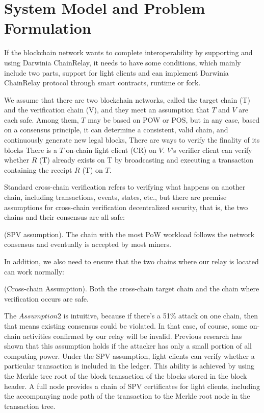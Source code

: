 \section{System Model and Problem Formulation}

If the blockchain network wants to complete interoperability by supporting and using Darwinia ChainRelay, it needs to have some conditions, which mainly include two parts, support for light clients and can implement Darwinia ChainRelay protocol through smart contracts, runtime or fork.

We assume that there are two blockchain networks, called the target chain (T) and the verification chain (V), and they meet an assumption that $T$ and $V$ are each safe. Among them, $T$ may be based on POW or POS, but in any case, based on a consensus principle, it can determine a consistent, valid chain, and continuously generate new legal blocks, There are ways to verify the finality of its blocks There is a $T$ on-chain light client (CR) on $V$. $V$'s verifier client can verify whether $R$ (T) already exists on T by broadcasting and executing a transaction containing the receipt $R$ (T) on $T$.

Standard cross-chain verification refers to verifying what happens on another chain, including transactions, events, states, etc., but there are premise assumptions for cross-chain verification decentralized security, that is, the two chains and their consensus are all safe:

\begin{assumption}
(SPV assumption). The chain with the most PoW workload follows the network consensus and eventually is accepted by most miners.
\end{assumption}

In addition, we also need to ensure that the two chains where our relay is located can work normally:

\begin{assumption}
(Cross-chain Assumption). Both the cross-chain target chain and the chain where verification occurs are safe.
\end{assumption}

The $Assumption 2$ is intuitive, because if there's a 51\% attack on one chain, then that means existing consensus could be violated. In that case, of course, some on-chain activities confirmed by our relay will be invalid. Previous research has shown that this assumption holds if the attacker has only a small portion of all computing power. Under the SPV assumption, light clients can verify whether a particular transaction is included in the ledger. This ability is achieved by using the Merkle tree root of the block transaction of the blocks stored in the block header. A full node provides a chain of SPV certificates for light clients, including the accompanying node path of the transaction to the Merkle root node in the transaction tree.


